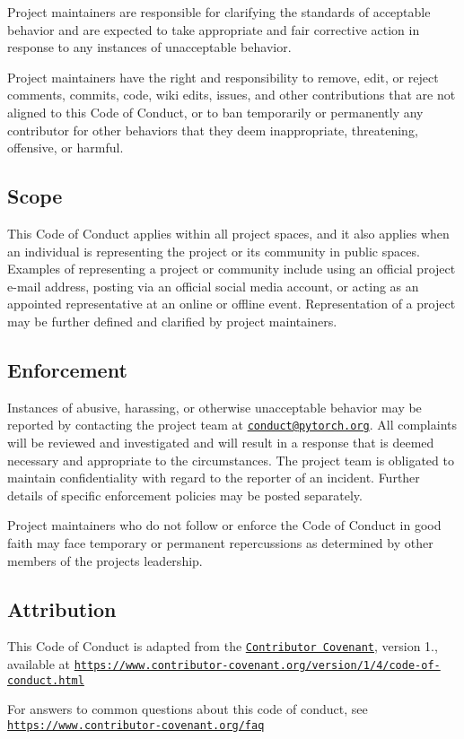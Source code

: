 Project maintainers are responsible for clarifying the standards of acceptable behavior and are expected to take appropriate and fair corrective action in response to any instances of unacceptable behavior.

Project maintainers have the right and responsibility to remove, edit, or reject comments, commits, code, wiki edits, issues, and other contributions that are not aligned to this Code of Conduct, or to ban temporarily or permanently any contributor for other behaviors that they deem inappropriate, threatening, offensive, or harmful.

\subsection*{Scope}

This Code of Conduct applies within all project spaces, and it also applies when an individual is representing the project or its community in public spaces. Examples of representing a project or community include using an official project e-\/mail address, posting via an official social media account, or acting as an appointed representative at an online or offline event. Representation of a project may be further defined and clarified by project maintainers.

\subsection*{Enforcement}

Instances of abusive, harassing, or otherwise unacceptable behavior may be reported by contacting the project team at \href{mailto:conduct@pytorch.org}{\tt conduct@pytorch.\+org}. All complaints will be reviewed and investigated and will result in a response that is deemed necessary and appropriate to the circumstances. The project team is obligated to maintain confidentiality with regard to the reporter of an incident. Further details of specific enforcement policies may be posted separately.

Project maintainers who do not follow or enforce the Code of Conduct in good faith may face temporary or permanent repercussions as determined by other members of the project\textquotesingle{}s leadership.

\subsection*{Attribution}

This Code of Conduct is adapted from the \href{https://www.contributor-covenant.org}{\tt Contributor Covenant}, version 1., available at \href{https://www.contributor-covenant.org/version/1/4/code-of-conduct.html}{\tt https\+://www.\+contributor-\/covenant.\+org/version/1/4/code-\/of-\/conduct.\+html}

For answers to common questions about this code of conduct, see \href{https://www.contributor-covenant.org/faq}{\tt https\+://www.\+contributor-\/covenant.\+org/faq} 